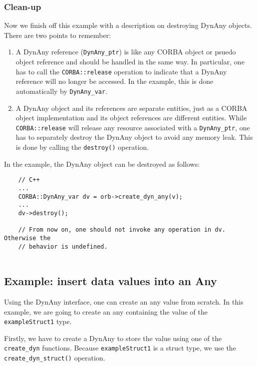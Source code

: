 \documentclass[11pt,twoside,onecolumn]{book}
\begin{document}
\subsubsection{Clean-up}
Now we finish off this example with a description on destroying DynAny
objects. There are two points to remember:

\begin{enumerate}
\item A DynAny reference ({\tt DynAny\_ptr}) is like any CORBA object or
psuedo object reference and should be handled in the same way. In
particular, one has to call the {\tt CORBA::release} operation to indicate
that a DynAny reference will no longer be accessed. In the example, this is
done automatically by {\tt DynAny\_var}.
\item A DynAny object and its references are separate entities, just as a
CORBA object implementation and its object references are different
entities. While {\tt CORBA::release} will release any resource associated
with a {\tt DynAny\_ptr}, one has to separately destroy the DynAny object
to avoid any memory leak. This is done by calling the {\tt destroy()}
operation.
\end{enumerate}

In the example, the DynAny object can be destroyed as follows:

{\small
\begin{verbatim}
    // C++
    ...
    CORBA::DynAny_var dv = orb->create_dyn_any(v);
    ...
    dv->destroy();
    
    // From now on, one should not invoke any operation in dv. Otherwise the
    // behavior is undefined.
    
\end{verbatim}
}

\subsection{Example: insert data values into an Any}

Using the DynAny interface, one can create an any value from scratch.  In
this example, we are going to create an any containing the value of the
{\tt exampleStruct1} type.

Firstly, we have to create a DynAny to store the value using one of the
{\tt create\_dyn} functions. Because {\tt exampleStruct1} is a struct type, we
use the {\tt create\_dyn\_struct()} operation.
\end{document}
